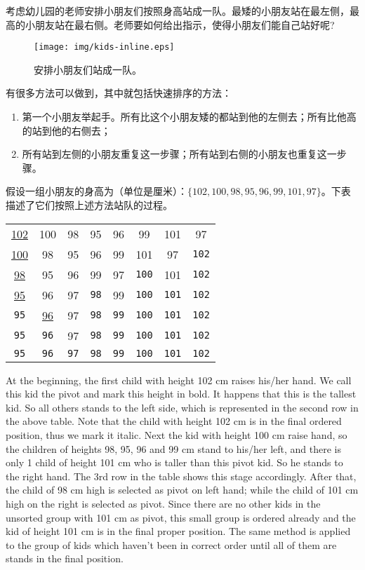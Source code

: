 \documentclass[UTF8]{article}
\begin{document}
考虑幼儿园的老师安排小朋友们按照身高站成一队。最矮的小朋友站在最左侧，最高的小朋友站在最右侧。老师要如何给出指示，使得小朋友们能自己站好呢?

\begin{figure}[htbp]
 \centering
 \texttt{[image: img/kids-inline.eps]}
 \caption{安排小朋友们站成一队。}
 \label{fig:knuth-ssort}
\end{figure}

有很多方法可以做到，其中就包括快速排序的方法：

\begin{enumerate}
  \item 第一个小朋友举起手。所有比这个小朋友矮的都站到他的左侧去；所有比他高的站到他的右侧去；
  \item 所有站到左侧的小朋友重复这一步骤；所有站到右侧的小朋友也重复这一步骤。
\end{enumerate}

假设一组小朋友的身高为（单位是厘米）：$\{102, 100, 98, 95, 96, 99, 101, 97\}$。下表描述了它们按照上述方法站队的过程。

\begin{tabular}{ | c c c c c c c c |}
\hline
\underline{102} & 100 & 98 & 95 & 96 & 99 & 101 & 97 \\
\underline{100} & 98 & 95 & 96 & 99 & 101 & 97 & {\tt 102} \\
\underline{98} & 95 & 96 & 99 & 97 & {\tt 100} & 101 & {\tt 102} \\
\underline{95} & 96 & 97 & {\tt 98} & 99 & {\tt 100} & {\tt 101} & {\tt 102} \\
{\tt 95} & \underline{96} & 97 & {\tt 98} & {\tt 99} & {\tt 100} & {\tt 101} & {\tt 102} \\
{\tt 95} & {\tt 96} & 97 & {\tt 98} & {\tt 99} & {\tt 100} & {\tt 101} & {\tt 102} \\
{\tt 95} & {\tt 96} & {\tt 97} & {\tt 98} & {\tt 99} & {\tt 100} & {\tt 101} & {\tt 102} \\
\hline
\end{tabular}

At the beginning, the first child with height 102 cm raises his/her hand. We call this kid the pivot and mark
this height in bold.
It happens that this is the tallest kid.
So all others stands to the left side, which is represented in the second row in the above table. Note that
the child with height 102 cm is in the final ordered position, thus we mark it italic. Next the kid with
height 100 cm raise hand, so the children of heights 98, 95, 96 and 99 cm stand to his/her left, and there
is only 1 child of height 101 cm who is taller than this pivot kid. So he stands to the right hand.
The 3rd row in the table shows this stage accordingly. After that, the child of 98 cm high is selected
as pivot on left hand; while the child of 101 cm high on the right is selected as pivot. Since there
are no other kids in the unsorted group with 101 cm as pivot, this small group is ordered already and
the kid of height 101 cm is in the final proper position. The same method is applied to the group of kids
which haven't been in correct order until all of them are stands in the final position.
\end{document}
